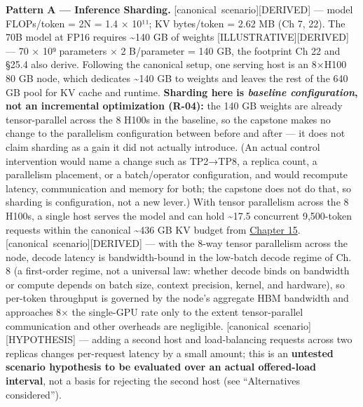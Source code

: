 \textbf{Pattern A --- Inference Sharding.} \mbox{{[}canonical
scenario{]}}\hspace{0pt}\mbox{{[}DERIVED{]}} --- model FLOPs/token = 2N = 1.4 × 10¹¹; KV
bytes/token = 2.62 MB (Ch 7, 22). The 70B model at FP16 requires
\textasciitilde140 GB of weights \mbox{{[}ILLUSTRATIVE{]}}\hspace{0pt}\mbox{{[}DERIVED{]}} --- 70
× 10⁹ parameters × 2 B/parameter = 140 GB, the footprint Ch 22 and §25.4
also derive. Following the canonical setup, one serving host is an
8×H100 80 GB node, which dedicates \textasciitilde140 GB to weights and
leaves the rest of the 640 GB pool for KV cache and runtime.
\textbf{Sharding here is \emph{baseline configuration}, not an
incremental optimization (R-04):} the 140 GB weights are already
tensor-parallel across the 8 H100s in the baseline, so the capstone
makes no change to the parallelism configuration between before and
after --- it does not claim sharding as a gain it did not actually
introduce. (An actual control intervention would name a change such as
TP2→TP8, a replica count, a parallelism placement, or a batch/operator
configuration, and would recompute latency, communication and memory for
both; the capstone does not do that, so sharding is configuration, not a
new lever.) With tensor parallelism across the 8 H100s, a single host
serves the model and can hold \textasciitilde17.5 concurrent 9,500-token
requests within the canonical \textasciitilde436 GB KV budget from
\hyperref[chap:15]{Chapter 15}. \mbox{{[}canonical scenario{]}}\hspace{0pt}\mbox{{[}DERIVED{]}} --- with the 8-way
tensor parallelism across the node, decode latency is bandwidth-bound in
the low-batch decode regime of Ch. 8 (a first-order regime, not a
universal law: whether decode binds on bandwidth or compute depends on
batch size, context precision, kernel, and hardware), so per-token
throughput is governed by the node's aggregate HBM bandwidth and
approaches 8× the single-GPU rate only to the extent tensor-parallel
communication and other overheads are negligible. \mbox{{[}canonical
scenario{]}}\hspace{0pt}\mbox{{[}HYPOTHESIS{]}} --- adding a second host and load-balancing
requests across two replicas changes per-request latency by a small
amount; this is an \textbf{untested scenario hypothesis to be evaluated
over an actual offered-load interval}, not a basis for rejecting the
second host (see ``Alternatives considered'').

